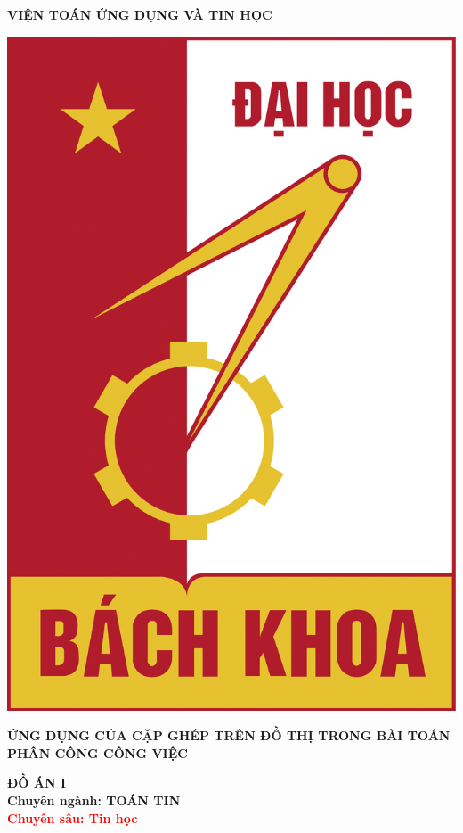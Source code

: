 \begin{titlepage}
\begin{minipage}{0.8\textwidth}
\begin{center}
    \vspace{5pt}
    \textbf{VIỆN TOÁN ỨNG DỤNG VÀ TIN HỌC}
\end{center}
\vspace{40pt}
\begin{center}
    \includegraphics[scale=0.175]{rpt-img/LOGO_HUST.png}
    
    \vspace{1.5cm}
    \fontsize{17pt}{18pt}\selectfont 
    \textbf{\bf\LARGE ỨNG DỤNG CỦA CẶP GHÉP TRÊN ĐỒ THỊ TRONG BÀI TOÁN PHÂN CÔNG CÔNG VIỆC}
    
    \vspace{2cm}
    \textbf{ĐỒ ÁN I}\\
    \textbf{Chuyên ngành: TOÁN TIN}\\
    \textcolor{red}{\textbf{Chuyên sâu: Tin học}}
\end{center}
    

\end{minipage}
\end{titlepage}
